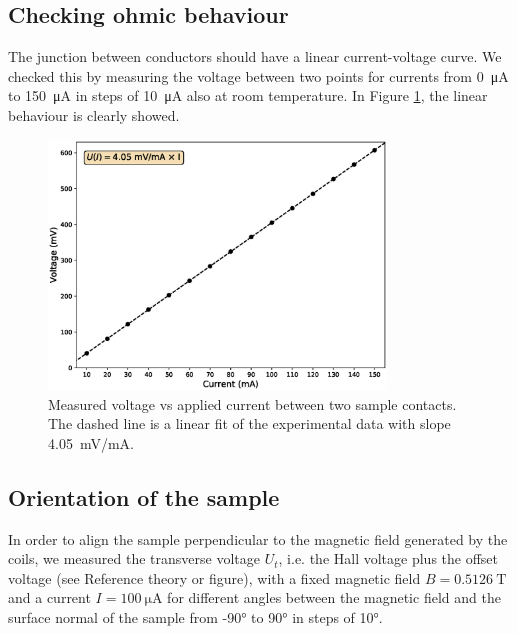 \documentclass[11pt,a4paper]{article}
\begin{document}
\subsection{Checking ohmic behaviour}

The junction between conductors should have a linear current-voltage curve. We checked this by measuring the voltage between two points for currents from \SI{0}{\micro\ampere} to \SI{150}{\micro\ampere} in steps of \SI{10}{\micro\ampere} also at room temperature. In Figure \ref{fig:ohmic_check}, the linear behaviour is clearly showed.

\begin{figure}[H]
\centering
\includegraphics[width=0.8\textwidth]{Voltage_vs_current_ohmic_test.eps}
\caption{Measured voltage vs applied current between two sample contacts. The dashed line is a linear fit of the experimental data with slope \SI{4.05}{\milli\volt/\milli\ampere}.}
\label{fig:ohmic_check}
\end{figure}

\subsection{Orientation of the sample}

In order to align the sample perpendicular to the magnetic field generated by the coils, we measured the transverse voltage $U_t$, i.e. the Hall voltage plus the offset voltage (see {\color{red}Reference theory or figure}), with a fixed magnetic field $B=\SI{0.5126}{\tesla}$ and a current $I=\SI{100}{\micro\ampere}$ for different angles between the magnetic field and the surface normal of the sample from \ang{-90} to \ang{90} in steps of \ang{10}.
\end{document}
